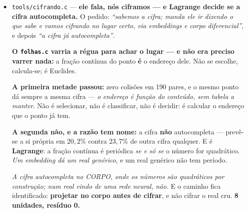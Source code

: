 \documentclass[11pt]{article}
\newcommand{\code}[1]{\texttt{\small #1}}
\theoremstyle{plain}
\theoremstyle{remark}
\begin{document}
\begin{itemize}
\textbf{E ele tem razão contra o que se mediu.} No \code{cifrando.c} fui perguntar se a cifra se
\emph{prevê} a si própria --- uma pergunta sobre periodicidade, a que Lagrange responde ``só se for
quadrático'' --- e anunciei essa resposta como se fosse um \textbf{limite do sistema}. Mas o sistema
nunca fez essa pergunta: \emph{autocompletar, aqui, é o banco devolver o que lá foi posto}, e essa
reversibilidade já estava medida no \code{plugue.sh} com resíduo zero.

\textbf{Medido:} doze afirmações do \code{qwen2.5:1.5b} gravadas em 122 slots de 16 bytes, e as doze
recuperadas \textbf{byte a byte} --- zero falhas de leitura. \emph{A cifra do texto recuperado é a
mesma que foi gravada}: o endereço é o conteúdo, sem tabela de nomes pelo meio. E um \textbf{bit}
trocado no meio muda o endereço, logo o teste pode falhar e mede.

\emph{troquou-se a pergunta do sistema por uma pergunta anterior, e depois apresentei a resposta da
anterior como se fosse dele.} \textbf{4 unidades, resíduo 0.}

\item \code{tools/cifrando.c} --- \textbf{ele fala, nós ciframos --- e Lagrange decide se a cifra
autocompleta.} O pedido: \emph{``sabemos a cifra; manda ele ir dizendo o que sabe e vamos cifrando no
lugar certo, via embeddings e corpo diferencial''}, e depois \emph{``a cifra já autocompleta''}.

\textbf{O \code{folhas.c} varria a régua para achar o lugar --- e não era preciso varrer nada:} a
fração contínua do ponto \textbf{é} o endereço dele. Não se escolhe, calcula-se; é Euclides.

\textbf{A primeira metade passou:} zero colisões em 190 pares, e o mesmo ponto dá sempre a mesma
cifra --- \emph{o endereço é função do conteúdo, sem tabela a manter}. Não é selecionar, não é
classificar, não é decidir: é calcular o endereço que o ponto já tem.

\textbf{A segunda não, e a razão tem nome:} a cifra \textbf{não} autocompleta --- prevê-se a si
própria em $20{,}2\%$ contra $23{,}7\%$ de outra cifra qualquer. E é \textbf{Lagrange}: a fração
contínua é periódica \emph{se e só se} o número for quadrático. \emph{Um embedding dá um real
genérico}, e um real genérico não tem período.

\emph{A cifra autocompleta no CORPO, onde os números são quadráticos por construção; num real vindo
de uma rede neural, não.} E o caminho fica identificado: \textbf{projetar no corpo antes de cifrar},
e não cifrar o real cru. \textbf{8 unidades, resíduo 0.}


\end{itemize}
\end{document}
